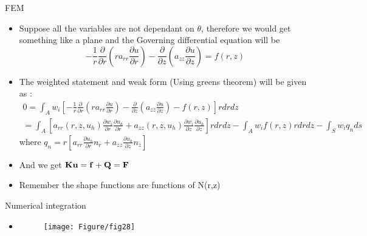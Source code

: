 	\begin{frame}{FEM}
		\begin{itemize}
			\item Suppose all the variables are not dependant on $\theta$, therefore we would get something like a plane and the Governing differential equation will be
			\begin{equation}
				-\frac{1}{r}\frac{\partial}{\partial r}\left(ra_{rr}\frac{\partial u}{\partial r} \right)
				- \frac{\partial}{\partial z}\left(a_{zz}\frac{\partial u}{\partial z} \right) = f(r,z)
			\end{equation}
			\item The weighted statement and weak form (Using greens theorem) will be given as :
			\begin{equation}
			\begin{aligned}
			 0 = \int_A w_i \left[ 	-\frac{1}{r}\frac{\partial}{\partial r}\left(ra_{rr}\frac{\partial u}{\partial r} \right)
			 - \frac{\partial}{\partial z}\left(a_{zz}\frac{\partial u}{\partial z} \right) - f(r,z)\right] rdrdz \\
			 = \int_A \left[ a_{rr}(r,z,u_h) \frac{\partial w_i}{\partial r}\frac{\partial u_h}{\partial r}
			 + a_{zz}(r,z,u_h) \frac{\partial w_i}{\partial z} \frac{\partial u_h}{\partial z}\right] rdrdz - \int_A w_if(r,z)rdrdz - \int_S w_iq_n ds 
			\end{aligned}
			\end{equation}
			where $q_n = r\left[ a_{rr} \frac{\partial u_h}{\partial r}n_r + a_{zz}\frac{\partial u_h}{\partial z} n_z\right]$
			\item And we get $\mathbf{Ku = f+Q = F}$
			\item Remember the shape functions are functions of N(r,z)	
	\end{itemize}
	\end{frame}


	\begin{frame}{Numerical integration}
		\begin{itemize}
			\item
			\begin{figure}
				\centering
				\texttt{[image: Figure/fig28]} 		
			\end{figure} 
			
		\end{itemize}
	\end{frame}

